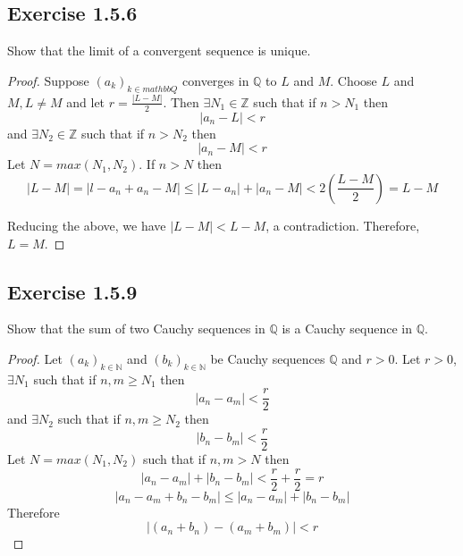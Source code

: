 \documentclass{tufte-book}
\theoremstyle{mytheoremstyle}
\theoremstyle{mylemstyle}
\theoremstyle{mydefstyle}
\begin{document}
\subsection{Exercise 1.5.6}
Show that the limit of a convergent sequence is unique.

\begin{proof}Suppose $(a_k)_{k \in mathbb{Q}}$ converges in $\mathbb{Q}$ to $L$ and $M$. Choose $L$ and $M , L \neq M$ and let $r=\frac{|L-M|}{2}$. Then $\exists N_1 \in \mathbb{Z}$ such that if $n>N_1$ 
then
\[|a_n-L|<r\]
and $\exists N_2 \in \mathbb{Z}$ such that if $n>N_2$ then
\[|a_n-M|<r\]
Let $N=max(N_1,N_2)$. If $n>N$ then 
\[|L-M| = |l-a_n + a_n - M| \leq |L-a_n| + |a_n-M| < 2(\frac{L-M}{2}) = L-M\]

Reducing the above, we have $|L-M| < L-M$, a contradiction.  Therefore, $L=M$.

\end{proof}

\subsection{Exercise 1.5.9}
Show that the sum of two Cauchy sequences in $\mathbb{Q}$ is a Cauchy sequence in $\mathbb{Q}$.

\begin{proof}Let $(a_k)_{k \in \mathbb{N}}$ and $(b_k)_{k \in \mathbb{N}}$ be Cauchy sequences $\mathbb{Q}$ and $r>0$. Let $r>0$, $\exists N_1$ such that if $n,m \geq N_1$ then 
\[|a_n - a_m| < \frac{r}{2}\]
and $\exists N_2$ such that if $n,m \geq N_2$ then 
\[|b_n - b_m| < \frac{r}{2}\]
Let $N=max(N_1,N_2)$ such that if $n,m>N$ then
\[|a_n - a_m| + |b_n - b_m| < \frac{r}{2} + \frac{r}{2} = r\]
\[|a_n - a_m + b_n - b_m| \leq |a_n - a_m| + |b_n - b_m|\]
Therefore
\[|(a_n + b_n) - (a_m + b_m)| < r\]

\end{proof}
\end{document}

